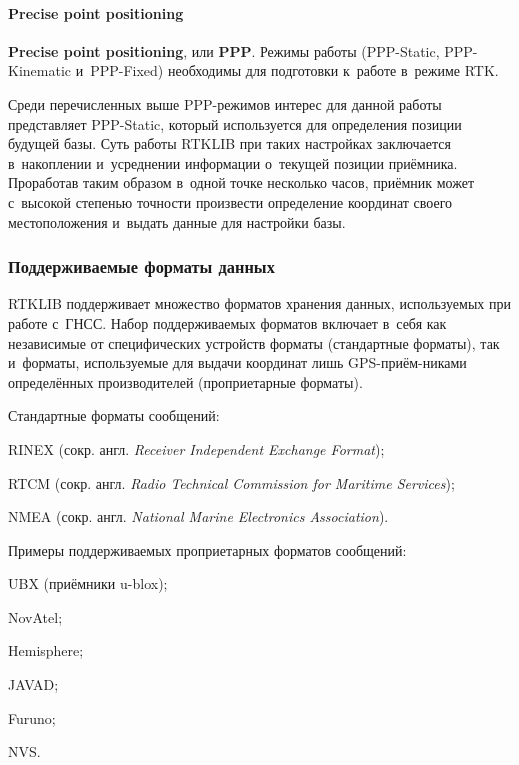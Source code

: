 \paragraph{Precise point positioning}

\textbf{Precise point positioning}, или \textbf{PPP}. Режимы работы (PPP-Static, PPP-Kinematic и~PPP-Fixed) необходимы для подготовки к~работе в~режиме RTK.

Среди перечисленных выше PPP-режимов интерес для данной работы представляет PPP-Static, который используется для определения позиции будущей базы. Суть работы RTKLIB при таких настройках заключается в~накоплении и~усреднении информации о~текущей позиции приёмника. Проработав таким образом в~одной точке несколько часов, приёмник может с~высокой степенью точности произвести определение координат своего местоположения и~выдать данные для настройки базы.


\subsubsection{Поддерживаемые форматы данных}
\label{subsec:rtklib-data-formats}

RTKLIB поддерживает множество форматов хранения данных, используемых при работе с~ГНСС. Набор поддерживаемых форматов включает в~себя как независимые от специфических устройств форматы (стандартные форматы), так и~форматы, используемые для выдачи координат лишь GPS-приём-никами определённых производителей (проприетарные форматы).

Стандартные форматы сообщений:
\begin{dashitemize}
  \item RINEX (сокр. англ. \emph{Receiver Independent Exchange Format});
  \item RTCM (сокр. англ. \emph{Radio Technical Commission for Maritime Services});
  \item NMEA (сокр. англ. \emph{National Marine Electronics Association}).
\end{dashitemize}

Примеры поддерживаемых проприетарных форматов сообщений:
\begin{dashitemize}
  \item UBX (приёмники u-blox);
  \item NovAtel;
  \item Hemisphere;
  \item JAVAD;
  \item Furuno;
  \item NVS.
\end{dashitemize}

